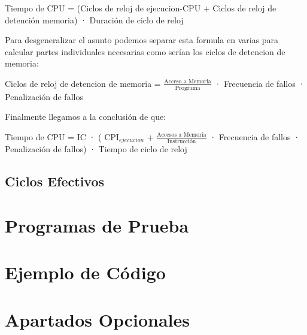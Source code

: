 \documentclass{article}
\begin{document}
\begin{adjustwidth}{2cm}{2cm}
\vspace{15pt}
Tiempo de CPU = (Ciclos de reloj de ejecucion-CPU + Ciclos de reloj de detención memoria) · Duración de ciclo de reloj
\vspace{15pt}
\end{adjustwidth}

Para desgeneralizar el asunto podemos separar esta formula en varias para calcular partes individuales necesarias como serían los ciclos de detencion de memoria:

\begin{adjustwidth}{2cm}{2cm}
\vspace{15pt}
  Ciclos de reloj de detencion de memoria = $\frac{\text{Acceso a Memoria}}{\text{Programa}}$ · Frecuencia de fallos · Penalización de fallos
\vspace{15pt}
\end{adjustwidth}

Finalmente llegamos a la conclusión de que:

\begin{adjustwidth}{2cm}{2cm}
\vspace{15pt}
  Tiempo de CPU = IC · ( CPI$_{ejecucion}$ + $\frac{\text{Accesos a Memoria}}{\text{Instrucción}}$ · Frecuencia de fallos · Penalización de fallos) · Tiempo de ciclo de reloj
\vspace{15pt}
\end{adjustwidth}

\subsection{Ciclos Efectivos}
\lipsum[9-10]

\section{Programas de Prueba}
\lipsum[10-12]

\section{Ejemplo de Código}
\lipsum[13-14]

\section{Apartados Opcionales}
\end{document}
